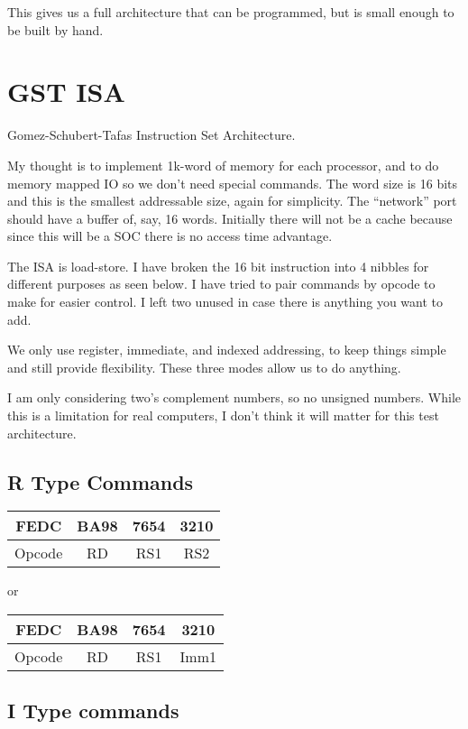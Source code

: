 This gives us a full architecture that can be programmed, but is small enough to be built by hand.


\section{GST ISA}

Gomez-Schubert-Tafas Instruction Set Architecture.

My thought is to implement 1k-word of memory for each processor, and to do memory mapped IO so we don't need special commands.  The word size is 16 bits and this is the smallest addressable size, again for simplicity.  The ``network'' port should have a buffer of, say, 16 words.  Initially there will not be a cache because since this will be a SOC there is no access time advantage.

The ISA is load-store.  I have broken the 16 bit instruction into 4 nibbles for different purposes as seen below.  I have tried to pair commands by opcode to make for easier control.  I left two unused in case there is anything you want to add.

We only use register, immediate, and indexed addressing, to keep things simple and still provide flexibility.  These three modes allow us to do anything.

I am only considering two's complement numbers, so no unsigned numbers.  While this is a limitation for real computers, I don't think it will matter for this test architecture.

\subsection{R Type Commands}

\noindent
\begin{tabular}{|c|c|c|c|} \hline
FEDC   & BA98 & 7654 & 3210 \\ \hline
Opcode & RD   & RS1  & RS2  \\ \hline
\end{tabular}

or

\noindent
\begin{tabular}{|c|c|c|c|} \hline
FEDC   & BA98 & 7654 & 3210 \\ \hline
Opcode & RD   & RS1  & Imm1 \\ \hline
\end{tabular}

\subsection{I Type commands}

